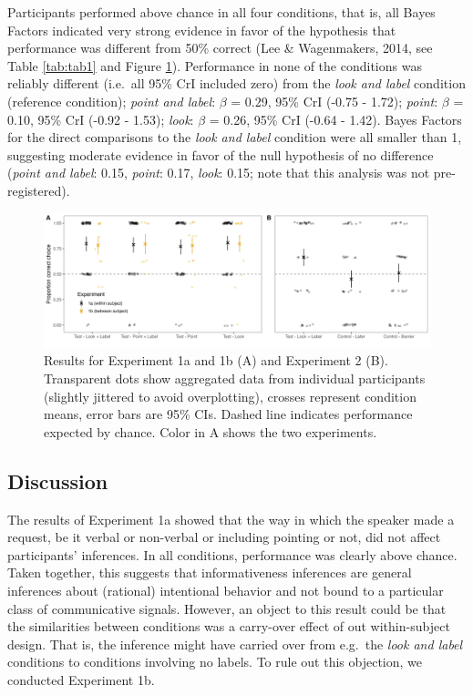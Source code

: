 \documentclass[
  man,floatsintext]{apa6}
\begin{document}
Participants performed above chance in all four conditions, that is, all Bayes Factors indicated very strong evidence in favor of the hypothesis that performance was different from 50\% correct (Lee \& Wagenmakers, 2014, see Table \ref{tab:tab1} and Figure \ref{fig:fig2}). Performance in none of the conditions was reliably different (i.e.~all 95\% CrI included zero) from the \emph{look and label} condition (reference condition); \emph{point and label}: \(\beta\) = 0.29, 95\% CrI (-0.75 - 1.72); \emph{point}: \(\beta\) = 0.10, 95\% CrI (-0.92 - 1.53); \emph{look}: \(\beta\) = 0.26, 95\% CrI (-0.64 - 1.42). Bayes Factors for the direct comparisons to the \emph{look and label} condition were all smaller than 1, suggesting moderate evidence in favor of the null hypothesis of no difference (\emph{point and label}: 0.15, \emph{point}: 0.17, \emph{look}: 0.15; note that this analysis was not pre-registered).

\begin{figure}

{\centering \includegraphics[width=1\linewidth]{../figures/fig2} 

}

\caption{Results for Experiment 1a and 1b (A) and Experiment 2 (B). Transparent dots show aggregated data from individual participants (slightly jittered to avoid overplotting), crosses represent condition means, error bars are 95\% CIs. Dashed line indicates performance expected by chance. Color in A shows the two experiments.}\label{fig:fig2}
\end{figure}

\hypertarget{discussion}{%
\subsection{Discussion}\label{discussion}}

The results of Experiment 1a showed that the way in which the speaker made a request, be it verbal or non-verbal or including pointing or not, did not affect participants' inferences. In all conditions, performance was clearly above chance. Taken together, this suggests that informativeness inferences are general inferences about (rational) intentional behavior and not bound to a particular class of communicative signals. However, an object to this result could be that the similarities between conditions was a carry-over effect of out within-subject design. That is, the inference might have carried over from e.g.~the \emph{look and label} conditions to conditions involving no labels. To rule out this objection, we conducted Experiment 1b.
\end{document}
